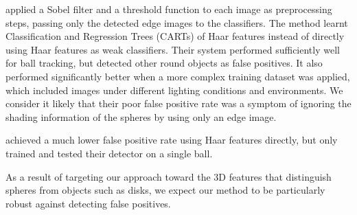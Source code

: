 \documentclass[11pt]{scrartcl}
\begin{document}
{        \citet{mitri2004fast} applied a Sobel filter and a threshold function
        to each image as preprocessing steps, passing only the detected edge
        images to the classifiers. The method learnt Classification and
        Regression Trees (CARTs) of Haar features instead of directly using
        Haar features as weak classifiers. Their system performed sufficiently
        well for ball tracking, but detected other round objects as false
        positives. It also performed significantly better when a more complex
        training dataset was applied, which included images under different 
        lighting conditions and environments. We consider it likely that their 
        poor false positive rate was a symptom of ignoring the shading 
        information of the spheres by using only an edge image.

        \citet{Treptow2004filter} achieved a much lower false positive rate
        using Haar features directly, but only trained and tested their
        detector on a single ball.



        As a result of targeting our approach toward the 3D features that
        distinguish spheres from objects such as disks, we expect our method
        to be particularly robust against detecting false positives.
	}
\end{document}
